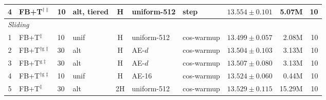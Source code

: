 \begin{table}[h]
{\begin{tabular}{@{}clllcllrrr@{}}
    4 & FB+T$^{\dag\ddag}$          & 10 & alt, tiered & H  & uniform-512 & step    & $13.554 \pm 0.101$          & 5.07M  & 10 \\
    \midrule
    \multicolumn{9}{l}{\textit{Sliding}} \\
    \midrule
    1 & FB+T$^{\ddag}$              & 10 & unif        & H  & uniform-512 & cos-warmup & $\mathbf{13.499 \pm 0.057}$ & 2.08M  & 10 \\
    2 & FB+T$^{\dag\mathrm{g}\ddag}$ & 30 & alt        & H  & AE-$d$      & cos-warmup & $13.504 \pm 0.103$          & 3.13M  & 10 \\
    3 & FB+T$^{\mathrm{g}\ddag}$    & 30 & alt         & H  & AE-$d$      & cos-warmup & $13.507 \pm 0.080$          & 3.13M  & 10 \\
    4 & FB+T$^{\dag\mathrm{g}\ddag}$ & 10 & unif       & H  & AE-16       & cos-warmup & $13.524 \pm 0.060$          & 0.44M  & 10 \\
    5 & FB+T$^{\ddag}$              & 30 & alt         & 2H & uniform-512 & cos-warmup & $13.529 \pm 0.115$          & 15.29M & 10 \\
    \bottomrule
  \end{tabular}}
\end{table}